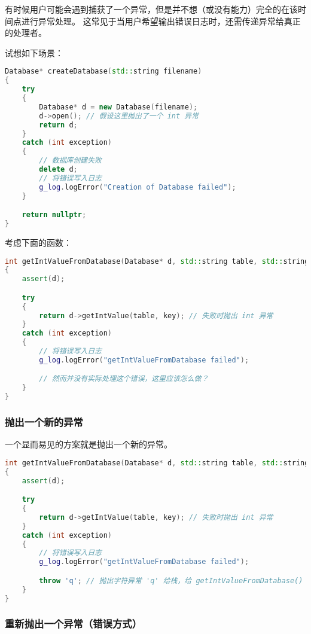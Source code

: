 \documentclass[../../LearnCpp.tex]{subfiles}
\begin{document}

有时候用户可能会遇到捕获了一个异常，但是并不想（或没有能力）完全的在该时间点进行异常处理。
这常见于当用户希望输出错误日志时，还需传递异常给真正的处理者。

试想如下场景：

\begin{lstlisting}[language=C++]
Database* createDatabase(std::string filename)
{
    try
    {
        Database* d = new Database(filename);
        d->open(); // 假设这里抛出了一个 int 异常
        return d;
    }
    catch (int exception)
    {
        // 数据库创建失败
        delete d;
        // 将错误写入日志
        g_log.logError("Creation of Database failed");
    }

    return nullptr;
}
\end{lstlisting}

考虑下面的函数：

\begin{lstlisting}[language=C++]
int getIntValueFromDatabase(Database* d, std::string table, std::string key)
{
    assert(d);

    try
    {
        return d->getIntValue(table, key); // 失败时抛出 int 异常
    }
    catch (int exception)
    {
        // 将错误写入日志
        g_log.logError("getIntValueFromDatabase failed");

        // 然而并没有实际处理这个错误，这里应该怎么做？
    }
}
\end{lstlisting}

\subsubsection*{抛出一个新的异常}

一个显而易见的方案就是抛出一个新的异常。

\begin{lstlisting}[language=C++]
int getIntValueFromDatabase(Database* d, std::string table, std::string key)
{
    assert(d);

    try
    {
        return d->getIntValue(table, key); // 失败时抛出 int 异常
    }
    catch (int exception)
    {
        // 将错误写入日志
        g_log.logError("getIntValueFromDatabase failed");

        throw 'q'; // 抛出字符异常 'q' 给栈，给 getIntValueFromDatabase() 的调用者去处理
    }
}
\end{lstlisting}

\subsubsection*{重新抛出一个异常（错误方式）}
\end{document}
